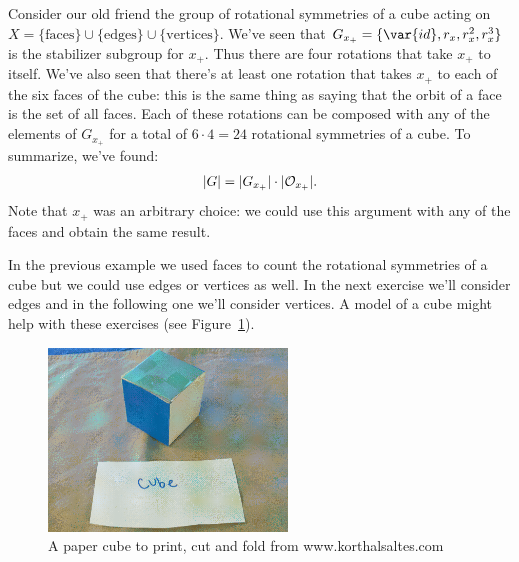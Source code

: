 \begin{example}\label{example:actions:CountingFormula1} 
Consider our old friend the group of rotational symmetries of a cube acting on $X=\{\text{faces}\}\cup\{\text{edges}\}\cup\{\text{vertices}\}$. We've seen that $G_{x_+}=\{\var{id},r_x,r_x^2,r_x^3\}$ is the stabilizer subgroup for $x_+$.  Thus there are four rotations that take $x_+$ to itself.  We've also seen that there's at least one rotation that takes $x_+$ to each of the six faces of the cube:  this is the same thing as saying that the orbit of a face is the set of all faces.  Each of these rotations can be composed with any of the elements of $G_{x_+}$ for a total of $6\cdot 4=24$ rotational symmetries of a cube.  To summarize, we've found: 
$$|G|=|G_{x_+}|\cdot |{\cal O}_{x_+}|.$$
Note that $x_+$ was an arbitrary choice: we could use this argument with any of the faces and obtain the same result.
\end{example}

In the previous example we used faces to count the rotational symmetries of a cube but we could use edges or vertices as well.  In the next exercise we'll consider edges and in the following one we'll consider vertices.   A model of a cube might help with these exercises (see Figure~\ref{fig:CubeFold}).

\begin{figure}[ht]
\begin{center}
\includegraphics[width=2.5in]{images/CubeFold.png}
\caption{A paper cube to print, cut and fold from www.korthalsaltes.com}
 \label{fig:CubeFold}
\end{center}
\end{figure}

